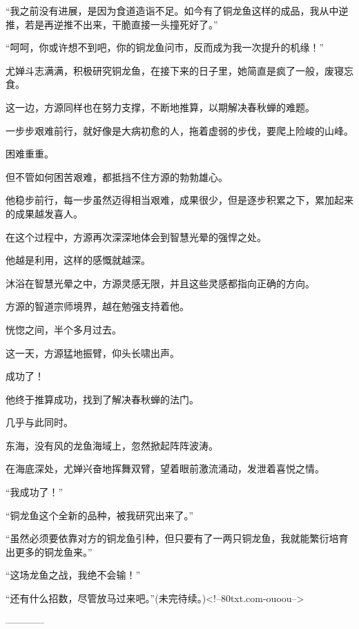 \begin{this_body}
“我之前没有进展，是因为食道造诣不足。如今有了铜龙鱼这样的成品，我从中逆推，若是再逆推不出来，干脆直接一头撞死好了。”

“呵呵，你或许想不到吧，你的铜龙鱼问市，反而成为我一次提升的机缘！”

尤婵斗志满满，积极研究铜龙鱼，在接下来的日子里，她简直是疯了一般，废寝忘食。

这一边，方源同样也在努力支撑，不断地推算，以期解决春秋蝉的难题。

一步步艰难前行，就好像是大病初愈的人，拖着虚弱的步伐，要爬上险峻的山峰。

困难重重。

但不管如何困苦艰难，都抵挡不住方源的勃勃雄心。

他稳步前行，每一步虽然迈得相当艰难，成果很少，但是逐步积累之下，累加起来的成果越发喜人。

在这个过程中，方源再次深深地体会到智慧光晕的强悍之处。

他越是利用，这样的感慨就越深。

沐浴在智慧光晕之中，方源灵感无限，并且这些灵感都指向正确的方向。

方源的智道宗师境界，越在勉强支持着他。

恍惚之间，半个多月过去。

这一天，方源猛地振臂，仰头长啸出声。

成功了！

他终于推算成功，找到了解决春秋蝉的法门。

几乎与此同时。

东海，没有风的龙鱼海域上，忽然掀起阵阵波涛。

在海底深处，尤婵兴奋地挥舞双臂，望着眼前激流涌动，发泄着喜悦之情。

“我成功了！”

“铜龙鱼这个全新的品种，被我研究出来了。”

“虽然必须要依靠对方的铜龙鱼引种，但只要有了一两只铜龙鱼，我就能繁衍培育出更多的铜龙鱼来。”

“这场龙鱼之战，我绝不会输！”

“还有什么招数，尽管放马过来吧。”(未完待续。)<!--80txt.com-ouoou-->

------------

\end{this_body}

